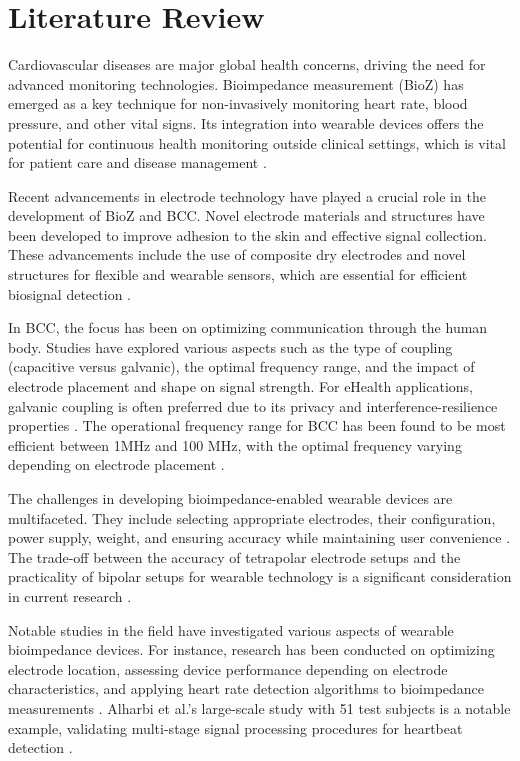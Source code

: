\section{Literature Review}
{
Cardiovascular diseases are major global health concerns, driving the need for advanced monitoring technologies. Bioimpedance measurement (BioZ) has emerged as a key technique for non-invasively monitoring heart rate, blood pressure, and other vital signs. Its integration into wearable devices offers the potential for continuous health monitoring outside clinical settings, which is vital for patient care and disease management \cite{OriginalSource1, towards, NewSource1}.

Recent advancements in electrode technology have played a crucial role in the development of BioZ and BCC. Novel electrode materials and structures have been developed to improve adhesion to the skin and effective signal collection. These advancements include the use of composite dry electrodes and novel structures for flexible and wearable sensors, which are essential for efficient biosignal detection \cite{PubMedArticle, NewSource2}.

In BCC, the focus has been on optimizing communication through the human body. Studies have explored various aspects such as the type of coupling (capacitive versus galvanic), the optimal frequency range, and the impact of electrode placement and shape on signal strength. For eHealth applications, galvanic coupling is often preferred due to its privacy and interference-resilience properties \cite{electrode_comp, NewSource3}. The operational frequency range for BCC has been found to be most efficient between 1MHz and 100 MHz, with the optimal frequency varying depending on electrode placement \cite{electrode_comp, NewSource4}.

The challenges in developing bioimpedance-enabled wearable devices are multifaceted. They include selecting appropriate electrodes, their configuration, power supply, weight, and ensuring accuracy while maintaining user convenience \cite{OriginalSource1, towards, NewSource5}. The trade-off between the accuracy of tetrapolar electrode setups and the practicality of bipolar setups for wearable technology is a significant consideration in current research \cite{towards, NewSource6}.

Notable studies in the field have investigated various aspects of wearable bioimpedance devices. For instance, research has been conducted on optimizing electrode location, assessing device performance depending on electrode characteristics, and applying heart rate detection algorithms to bioimpedance measurements \cite{towards, PubMedArticle, NewSource7}. Alharbi et al.'s large-scale study with 51 test subjects is a notable example, validating multi-stage signal processing procedures for heartbeat detection \cite{towards, NewSource8}.

}
